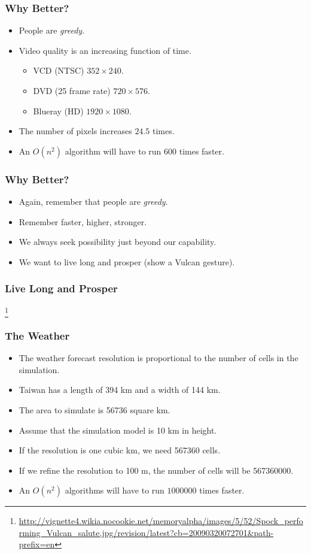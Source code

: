 \documentclass{beamer}
\begin{document}
\begin{CJK}{UTF8}{bsmi}
\begin{frame}
\frametitle{Why Better?}
\begin{itemize}
\item People are {\em greedy}.
\item Video quality is an increasing function of time.
\begin{itemize}
\item VCD (NTSC) $352 \times 240$.
\item DVD (25 frame rate) $720 \times 576$.
\item Blueray (HD) $1920 \times 1080$.
\end{itemize}
\item The number of pixels increases $24.5$ times.
\item An $O(n^2)$ algorithm will have to run $600$ times faster.
\end{itemize}
\end{frame}

\begin{frame}
\frametitle{Why Better?}
\begin{itemize}
\item Again, remember that people are {\em greedy}.
\item Remember faster, higher, stronger.
\item We always seek possibility just beyond our capability.
\item We want to live long and prosper (show a Vulcan gesture).
\end{itemize}
\end{frame}

\begin{frame}
\frametitle{Live Long and Prosper}
\centerline{}
\footnote{\url{http://vignette4.wikia.nocookie.net/memoryalpha/images/5/52/Spock_performing_Vulcan_salute.jpg/revision/latest?cb=20090320072701&path-prefix=en}}
\end{frame}

\begin{frame}
\frametitle{The Weather}
\begin{itemize}
\item The weather forecast resolution is proportional to the number of
  cells in the simulation.
\item Taiwan has a length of 394 km and a width of 144 km.
\item The area to simulate is 56736 square km. 
\item Assume that the simulation model is 10 km in height.
\item If the resolution is one cubic km, we need 567360 cells.
\item If we refine the resolution to 100 m, the number of cells will be
  567360000.
\item An $O(n^2)$ algorithms will have to run $1000000$ times faster.
\end{itemize}
\end{frame}


\end{CJK}
\end{document}
